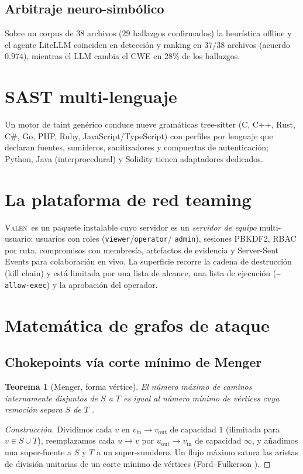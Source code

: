 \documentclass[journal]{IEEEtran}
\newcommand{\valen}{\textsc{Valen}}
\newtheorem{theorem}{Teorema}
\begin{document}
\subsection{Arbitraje neuro-simbólico}
\label{sec:neuro}
Sobre un corpus de 38 archivos ($29$ hallazgos confirmados) la heurística offline
y el agente LiteLLM coinciden en detección y ranking en $37/38$ archivos (acuerdo
$0.974$), mientras el LLM cambia el CWE en $28\%$ de los hallazgos.

\section{SAST multi-lenguaje}
\label{sec:langs}
Un motor de taint genérico conduce nueve gramáticas tree-sitter (C, C++, Rust,
C\#, Go, PHP, Ruby, JavaScript/TypeScript) con perfiles por lenguaje que declaran
fuentes, sumideros, sanitizadores y compuertas de autenticación; Python, Java
(interprocedural) y Solidity tienen adaptadores dedicados.

\section{La plataforma de red teaming}
\label{sec:platform}
\valen\ es un paquete instalable cuyo servidor es un \emph{servidor de equipo}
multi-usuario: usuarios con roles (\texttt{viewer}/\texttt{operator}/
\texttt{admin}), sesiones PBKDF2, RBAC por ruta, compromisos con membresía,
artefactos de evidencia y Server-Sent Events para colaboración en vivo. La
superficie recorre la cadena de destrucción (kill chain) y está limitada por una
lista de alcance, una lista de ejecución (\texttt{--allow-exec}) y la aprobación
del operador.

\section{Matemática de grafos de ataque}
\label{sec:math}

\subsection{Chokepoints vía corte mínimo de Menger}
\begin{theorem}[Menger, forma vértice]
\label{thm:menger}
El número máximo de caminos internamente disjuntos de $S$ a $T$ es igual al número
mínimo de vértices cuya remoción separa $S$ de $T$ \cite{menger1927}.
\end{theorem}
\begin{proof}[Construcción]
Dividimos cada $v$ en $v_{\mathrm{in}}\to v_{\mathrm{out}}$ de capacidad $1$
(ilimitada para $v\in S\cup T$), reemplazamos cada $u\to v$ por
$u_{\mathrm{out}}\to v_{\mathrm{in}}$ de capacidad $\infty$, y añadimos una
super-fuente a $S$ y $T$ a un super-sumidero. Un flujo máximo satura las aristas de
división unitarias de un corte mínimo de vértices (Ford--Fulkerson
\cite{ford1956}). \qedhere
\end{proof}
\end{document}
